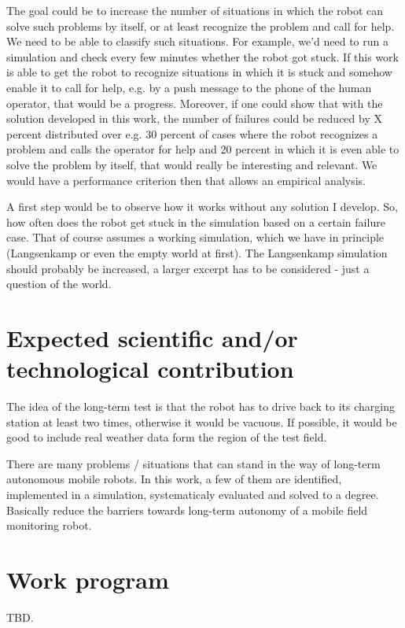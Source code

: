 \documentclass[german, master, expose, latin1]{base/thesis_KBS}
\begin{document}
The goal could be to increase the number of situations in which the robot can solve such problems by itself, or at least recognize the problem and call for help.
We need to be able to classify such situations. For example, we'd need to run a simulation and check every few minutes whether the robot got stuck.
If this work is able to get the robot to recognize situations in which it is stuck and somehow enable it to call for help, e.g. by a push message to
the phone of the human operator, that would be a progress. Moreover, if one could show that with the solution developed in this work, the number of failures
could be reduced by X percent distributed over e.g. 30 percent of cases where the robot recognizes a problem and calls the operator for help and 20 percent in which
it is even able to solve the problem by itself, that would really be interesting and relevant. We would have a performance criterion then that allows 
an empirical analysis.\newline

A first step would be to observe how it works without any solution I develop. So, how often does the robot get stuck in the simulation based on a certain failure
case. That of course assumes a working simulation, which we have in principle (Langsenkamp or even the empty world at first). The Langsenkamp simulation should
probably be increased, a larger excerpt has to be considered - just a question of the world.

\section{Expected scientific and/or technological contribution}

The idea of the long-term test is that the robot has to drive back to its charging station at least two times, otherwise it would be vacuous.
If possible, it would be good to include real weather data form the region of the test field.\newline

There are many problems / situations that can stand in the way of long-term autonomous mobile robots. In this work, a few of them are identified,
implemented in a simulation, systematicaly evaluated and solved to a degree. Basically reduce the barriers towards long-term autonomy of a mobile field
monitoring robot.

\section{Work program}

TBD.


\end{document}
